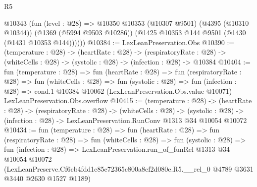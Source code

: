 \begin{lexlean}{R5}
\begin{coremodule}
      @10343
        (fun (level : @28) =>
        @10350
          @10353
          (@10307 @9501)
          (@4395 (@10310 @10344))
          (@1369 (@5994 @9503 @10286))
          (@1425 @10353 @144 @9501 (@1430 (@1431 @10353 @144))))))
@10384 := LexLeanPreservation.Obs
@10390 := (temperature : @28) ->
  (heartRate : @28) ->
  (respiratoryRate : @28) -> (whiteCells : @28) -> (systolic : @28) -> (infection : @28) -> @10384
@10404 := fun (temperature : @28) =>
  fun (heartRate : @28) =>
  fun (respiratoryRate : @28) =>
  fun (whiteCells : @28) =>
  fun (systolic : @28) =>
  fun (infection : @28) =>
  cond.{1} @10384 @10062 (LexLeanPreservation.Obs.value @10071) LexLeanPreservation.Obs.overflow
@10415 := (temperature : @28) ->
  (heartRate : @28) ->
  (respiratoryRate : @28) ->
  (whiteCells : @28) ->
  (systolic : @28) -> (infection : @28) -> LexLeanPreservation.RunConv @1313 @34 @10054 @10072
@10434 := fun (temperature : @28) =>
  fun (heartRate : @28) =>
  fun (respiratoryRate : @28) =>
  fun (whiteCells : @28) =>
  fun (systolic : @28) =>
  fun (infection : @28) =>
  LexLeanPreservation.run_of_funRel
    @1313
    @34
    @10054
    @10072
    (LexLeanPreserve.Cf6cb4fdd1e85e72365c800a8ef2d080e.R5.__rel_0
      @4789
      @3631
      @3440
      @2630
      @1527
      @1189)
\end{coremodule}
\end{lexlean}
